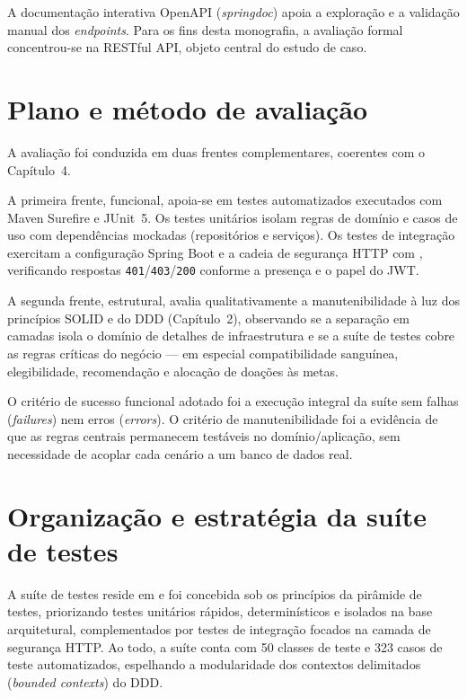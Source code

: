 A documentação interativa OpenAPI (\textit{springdoc}) apoia a exploração e a validação manual dos \textit{endpoints}. Para os fins desta monografia, a avaliação formal concentrou-se na RESTful API, objeto central do estudo de caso.

\section{Plano e método de avaliação}

A avaliação foi conduzida em duas frentes complementares, coerentes com o Capítulo~4.

A primeira frente, funcional, apoia-se em testes automatizados executados com Maven Surefire e JUnit~5. Os testes unitários isolam regras de domínio e casos de uso com dependências mockadas (repositórios e serviços). Os testes de integração exercitam a configuração Spring Boot e a cadeia de segurança HTTP com , verificando respostas \texttt{401}/\texttt{403}/\texttt{200} conforme a presença e o papel do JWT.

A segunda frente, estrutural, avalia qualitativamente a manutenibilidade à luz dos princípios SOLID e do DDD (Capítulo~2), observando se a separação em camadas isola o domínio de detalhes de infraestrutura e se a suíte de testes cobre as regras críticas do negócio --- em especial compatibilidade sanguínea, elegibilidade, recomendação e alocação de doações às metas.

O critério de sucesso funcional adotado foi a execução integral da suíte sem falhas (\textit{failures}) nem erros (\textit{errors}). O critério de manutenibilidade foi a evidência de que as regras centrais permanecem testáveis no domínio/aplicação, sem necessidade de acoplar cada cenário a um banco de dados real.

\section{Organização e estratégia da suíte de testes}

A suíte de testes reside em  e foi concebida sob os princípios da pirâmide de testes, priorizando testes unitários rápidos, determinísticos e isolados na base arquitetural, complementados por testes de integração focados na camada de segurança HTTP. Ao todo, a suíte conta com 50 classes de teste e 323 casos de teste automatizados, espelhando a modularidade dos contextos delimitados (\textit{bounded contexts}) do DDD.

